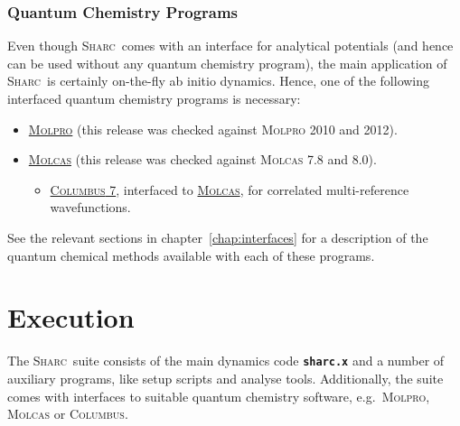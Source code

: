 \documentclass[a4paper,11pt,DIV=15,openany,twoside=false]{scrbook}
\newcommand{\sharc}{\textsc{Sharc}}
\newcommand{\ttt}[1]{\textbf{\texttt{#1}}}
\begin{document}

\subsection{Quantum Chemistry Programs}

Even though \sharc\ comes with an interface for analytical potentials (and hence can be used without any quantum chemistry program), the main application of \sharc\ is certainly on-the-fly ab initio dynamics. Hence, one of the following interfaced quantum chemistry programs is necessary:
\begin{itemize}
  \item \href{http://www.molpro.net/}{\textsc{Molpro}} (this release was checked against \textsc{Molpro} 2010 and 2012).
  \item \href{http://http://molcas.org/}{\textsc{Molcas}} (this release was checked against \textsc{Molcas} 7.8 and 8.0).
  \begin{itemize}
    \item \href{http://www.univie.ac.at/columbus/docs_COL70/documentation_main.html}{\textsc{Columbus} 7}, interfaced to \href{http://http://molcas.org/}{\textsc{Molcas}}, for correlated multi-reference wavefunctions. 
  \end{itemize}
\end{itemize}

See the relevant sections in chapter~\ref{chap:interfaces} for a description of the quantum chemical methods available with each of these programs.


\chapter{Execution}

The \sharc\ suite consists of the main dynamics code \ttt{sharc.x} and a number of auxiliary programs, like setup scripts and analyse tools. Additionally, the suite comes with interfaces to suitable quantum chemistry software, e.g.\ \textsc{Molpro}, \textsc{Molcas} or \textsc{Columbus}. 
\end{document}
